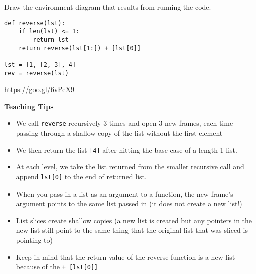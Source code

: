 \begin{blocksection}
\question Draw the environment diagram that results from running the code.

\begin{lstlisting}
def reverse(lst):
    if len(lst) <= 1:
        return lst
    return reverse(lst[1:]) + [lst[0]]

lst = [1, [2, 3], 4]
rev = reverse(lst)
\end{lstlisting}

\begin{solution}[2in]
\url{https://goo.gl/6vPeX9}
\end{solution}
\end{blocksection}

\begin{guide}
\begin{blocksection}
\textbf{Teaching Tips}
\begin{itemize}
    \item We call \lstinline{reverse} recursively 3 times and open 3 new frames, each time passing through a shallow copy of the list without the first element
    \item We then return the list \lstinline{[4]} after hitting the base case of a length 1 list.
    \item At each level, we take the list returned from the smaller recursive call and append \lstinline{lst[0]} to the end of returned list.
    \item When you pass in a list as an argument to a function, the new frame’s argument points to the same list passed in (it does not create a new list!)
    \item List slices create shallow copies (a new list is created but any pointers in the new list still point to the same thing that the original list that was sliced is pointing to)
    \item Keep in mind that the return value of the reverse function is a new list because of the \lstinline{+ [lst[0]]}
\end{itemize}
\end{blocksection}
\end{guide}
